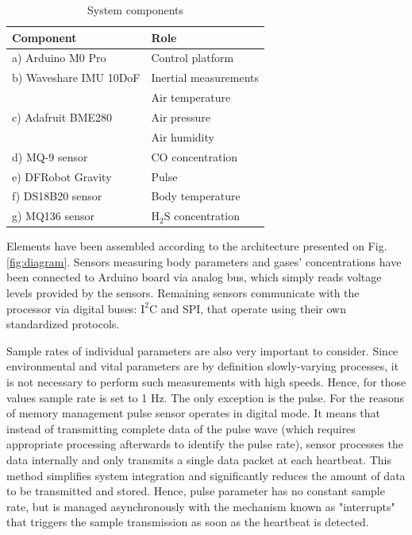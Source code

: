 \documentclass[10pt, a4paper]{article}
\begin{document}
\begin{table}[ht!]
    \centering
    \caption{System components}
  \begin{tabular}{|l|l|}
    \hline
    \textbf{Component} & \textbf{Role} \\ \hline
        a) Arduino M0 Pro & Control platform \\ \hline
        b) Waveshare IMU 10DoF & Inertial measurements \\ \hline
        \multirow{3}{9em}{c) Adafruit BME280} & Air temperature \\
        & Air pressure \\
        & Air humidity \\ \hline
        d) MQ-9 sensor & CO concentration \\ \hline
        e) DFRobot Gravity & Pulse \\ \hline
        f) DS18B20 sensor & Body temperature \\ \hline
        g) MQ136 sensor & $\mathrm{H_2S}$ concentration \\ \hline
    \end{tabular}
    \label{tab:tab2}
\end{table}

Elements have been assembled according to the architecture presented on Fig. \ref{fig:diagram}. Sensors measuring body parameters and gases' concentrations have been connected to Arduino board via analog bus, which simply reads voltage levels provided by the sensors. Remaining sensors communicate with the processor via digital buses: $\mathrm{I^2C}$ and SPI, that operate using their own standardized protocols.

Sample rates of individual parameters are also very important to consider. Since environmental and vital parameters are by definition slowly-varying processes, it is not necessary to perform such measurements with high speeds. Hence, for those values sample rate is set to 1 Hz. The only exception is the pulse. For the reasons of memory management pulse sensor operates in digital mode. It means that instead of transmitting complete data of the pulse wave (which requires appropriate processing afterwards to identify the pulse rate), sensor processes the data internally and only transmits a single data packet at each heartbeat. This method simplifies system integration and significantly reduces the amount of data to be transmitted and stored. Hence, pulse parameter has no constant sample rate, but is managed asynchronously with the mechanism known as "interrupts" that triggers the sample transmission as soon as the heartbeat is detected.
\end{document}

